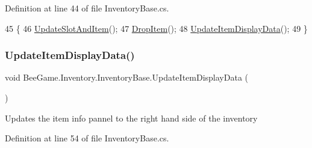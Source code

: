 Definition at line 44 of file Inventory\+Base.\+cs.


\begin{DoxyCode}
45         \{
46             \hyperlink{class_bee_game_1_1_inventory_1_1_inventory_base_aad83f463fba0efeffa7bdd2f92963ea9}{UpdateSlotAndItem}();
47             \hyperlink{class_bee_game_1_1_inventory_1_1_inventory_base_a53861c2cc0bd7af6a6569168c8866bf4}{DropItem}();
48             \hyperlink{class_bee_game_1_1_inventory_1_1_inventory_base_abceadbaeed5505437ba8141da8642dc7}{UpdateItemDisplayData}();
49         \}
\end{DoxyCode}
\mbox{\label{class_bee_game_1_1_inventory_1_1_inventory_base_abceadbaeed5505437ba8141da8642dc7}} 
\subsubsection{\texorpdfstring{Update\+Item\+Display\+Data()}{UpdateItemDisplayData()}}
{\footnotesize\ttfamily void Bee\+Game.\+Inventory.\+Inventory\+Base.\+Update\+Item\+Display\+Data (\begin{DoxyParamCaption}{ }\end{DoxyParamCaption})\hspace{0.3cm}{\ttfamily [private]}}



Updates the item info pannel to the right hand side of the inventory 



Definition at line 54 of file Inventory\+Base.\+cs.


